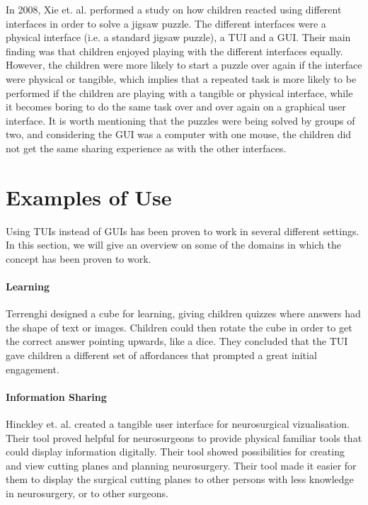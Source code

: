 In 2008, Xie et. al. performed a study on how children reacted using different interfaces in order to solve a jigsaw puzzle\cite{xie2008tangibles}. The different interfaces were a physical interface (i.e. a standard jigsaw puzzle), a TUI and a GUI. Their main finding was that children enjoyed playing with the different interfaces equally. However, the children were more likely to start a puzzle over again if the interface were physical or tangible, which implies that a repeated task is more likely to be performed if the children are playing with a tangible or physical interface, while it becomes boring to do the same task over and over again on a graphical user interface. It is worth mentioning that the puzzles were being solved by groups of two, and considering the GUI was a computer with one mouse, the children did not get the same sharing experience as with the other interfaces. 


\section{Examples of Use}
\label{sec:tuiexamples}
Using TUIs instead of GUIs has been proven to work in several different settings. In this section, we will give an overview on some of the domains in which the concept has been proven to work. 

\paragraph{Learning} 
Terrenghi \etal{} designed a cube for learning, giving children quizzes where answers had the shape of text or images\cite{terrenghi2006cube}. Children could then rotate the cube in order to get the correct answer pointing upwards, like a dice. They concluded that the TUI gave children a different set of affordances that prompted a great initial engagement\cite{terrenghi2006cube}. 

\paragraph{Information Sharing} 
Hinckley et. al. created a tangible user interface for neurosurgical vizualisation\cite{hinckley1994passive}. Their tool proved helpful for neurosurgeons to provide physical familiar tools that could display information digitally. Their tool showed possibilities for creating and view cutting planes and planning neurosurgery. Their tool made it easier for them to display the surgical cutting planes to other persons with less knowledge in neurosurgery, or to other surgeons. 


